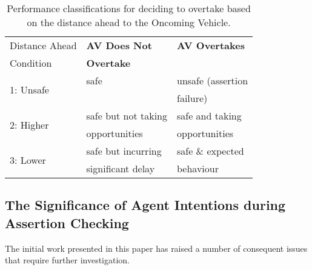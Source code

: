 \begin{table}[]
\centering
\begin{tabular}{|p{2.3cm}|p{2.3cm}|p{2.3cm}|}
\hline
\multicolumn{1}{|l|}{Distance Ahead} & \multicolumn{1}{l|}{\textbf{AV Does Not }} & \multicolumn{1}{l|}{\textbf{AV Overtakes}} \\ 
Condition & \textbf{Overtake} & \\
\hline
\multirow{2}{*}{1: Unsafe} & safe & unsafe (assertion \\
& & failure) \\
\hline
\multirow{2}{*}{2: Higher} & safe but not taking & safe and taking\\ 
      Performance & opportunities & opportunities\\
\hline
\multirow{2}{*}{3: Lower} & safe but incurring  & safe \& expected  \\ 
Performance & significant delay & behaviour\\
\hline
\end{tabular}
\caption{Performance classifications for deciding to overtake based on the distance ahead to the Oncoming Vehicle.}
\label{performance_metric_table}
\end{table}



\subsection{The Significance of Agent Intentions during Assertion Checking} %
The initial work presented in this paper has raised a number of consequent issues that require further investigation.

